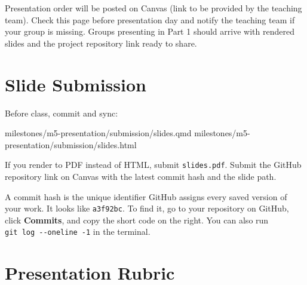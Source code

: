 \documentclass[
  letterpaper,
  DIV=11,
  numbers=noendperiod,
  oneside]{scrreprt}
\newenvironment{Shaded}{\begin{snugshade}}{\end{snugshade}}
\newcommand{\NormalTok}[1]{\textcolor[rgb]{0.00,0.23,0.31}{#1}}
\begin{document}
Presentation order will be posted on Canvas (link to be provided by the
teaching team). Check this page before presentation day and notify the
teaching team if your group is missing. Groups presenting in Part 1
should arrive with rendered slides and the project repository link ready
to share.

\section*{Slide Submission}\label{slide-submission}


Before class, commit and sync:

\begin{Shaded}
\begin{Highlighting}[numbers=left,,]
\NormalTok{milestones/m5{-}presentation/submission/slides.qmd}
\NormalTok{milestones/m5{-}presentation/submission/slides.html}
\end{Highlighting}
\end{Shaded}

If you render to PDF instead of HTML, submit \texttt{slides.pdf}. Submit
the GitHub repository link on Canvas with the latest commit hash and the
slide path.

\begin{tcolorbox}[enhanced jigsaw, title=\textcolor{quarto-callout-note-color}{\faInfo}\hspace{0.5em}{What is a commit hash?}, arc=.35mm, toptitle=1mm, colframe=quarto-callout-note-color-frame, toprule=.15mm, leftrule=.75mm, bottomtitle=1mm, opacityback=0, bottomrule=.15mm, coltitle=black, breakable, opacitybacktitle=0.6, titlerule=0mm, colback=white, left=2mm, colbacktitle=quarto-callout-note-color!10!white, rightrule=.15mm]

A commit hash is the unique identifier GitHub assigns every saved
version of your work. It looks like \texttt{a3f92bc}. To find it, go to
your repository on GitHub, click \textbf{Commits}, and copy the short
code on the right. You can also run \texttt{git\ log\ -\/-oneline\ -1}
in the terminal.

\end{tcolorbox}

\section*{Presentation Rubric}\label{presentation-rubric}
\end{document}

